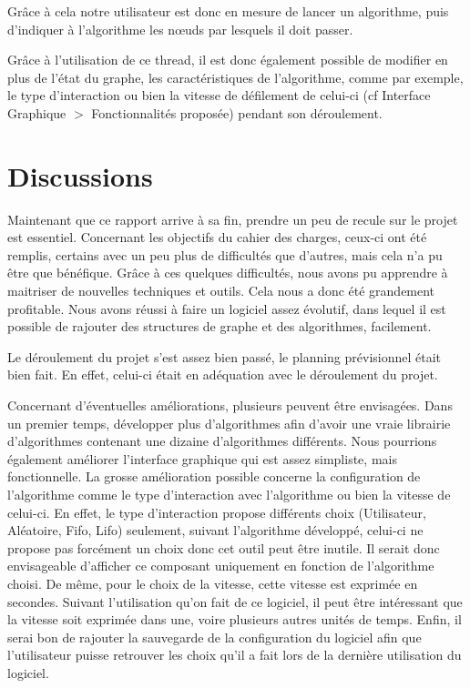 \documentclass[11pt,a4paper]{article}
\begin{document}
		Grâce à cela notre utilisateur est donc en mesure de lancer un algorithme, puis d'indiquer à l'algorithme les n\oe uds par lesquels il doit passer.
		
		Grâce à l'utilisation de ce thread, il est donc également possible de modifier en plus de l'état du graphe, les caractéristiques de l'algorithme, comme par exemple, le type d'interaction ou bien la vitesse de défilement de celui-ci (cf Interface Graphique $>$ Fonctionnalités proposée) pendant son déroulement.
	
	\newpage
	\section{Discussions}
		Maintenant que ce rapport arrive à sa fin, prendre un peu de recule sur le projet est essentiel. Concernant les objectifs du cahier des charges, ceux-ci ont été remplis, certains avec un peu plus de difficultés que d'autres, mais cela n'a pu être que bénéfique. Grâce à ces quelques difficultés, nous avons pu apprendre à maitriser de nouvelles techniques et outils. Cela nous a donc été grandement profitable. Nous avons réussi à faire un logiciel assez évolutif, dans lequel il est possible de rajouter des structures de graphe et des algorithmes, facilement.
		
		Le déroulement du projet s'est assez bien passé, le planning prévisionnel était bien fait. En effet, celui-ci était en adéquation avec le déroulement du projet.
		
		Concernant d'éventuelles améliorations, plusieurs peuvent être envisagées. Dans un premier temps, développer plus d'algorithmes afin d'avoir une vraie librairie d'algorithmes contenant une dizaine d'algorithmes différents. Nous pourrions également améliorer l'interface graphique qui est assez simpliste, mais fonctionnelle. La grosse amélioration possible concerne la configuration de l'algorithme comme le type d'interaction avec l'algorithme ou bien la vitesse de celui-ci. En effet, le type d'interaction  propose différents choix (Utilisateur, Aléatoire, Fifo, Lifo) seulement, suivant l'algorithme développé, celui-ci ne propose pas forcément un choix donc cet outil peut \^etre inutile. Il serait donc envisageable d'afficher ce composant uniquement en fonction de l'algorithme choisi. De même, pour le choix de la vitesse, cette vitesse est exprimée en secondes. Suivant l'utilisation qu'on fait de ce logiciel, il peut être intéressant que la vitesse soit exprimée dans une, voire plusieurs autres unités de temps. Enfin, il serai bon de rajouter la sauvegarde de la configuration du logiciel afin que l'utilisateur puisse retrouver les choix qu'il a fait lors de la dernière utilisation du logiciel.
\end{document}

